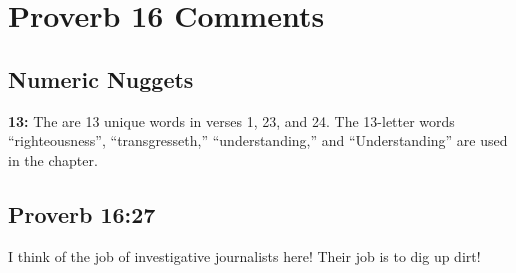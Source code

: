 \section{Proverb 16 Comments}

\subsection{Numeric Nuggets}
\textbf{13: } The are 13 unique words in verses 1, 23, and 24. The 13-letter words ``righteousness'', ``transgresseth,'' ``understanding,'' and ``Understanding'' are used in the chapter.

\subsection{Proverb 16:27}
I think of the job of investigative journalists here! Their job is to dig up dirt!